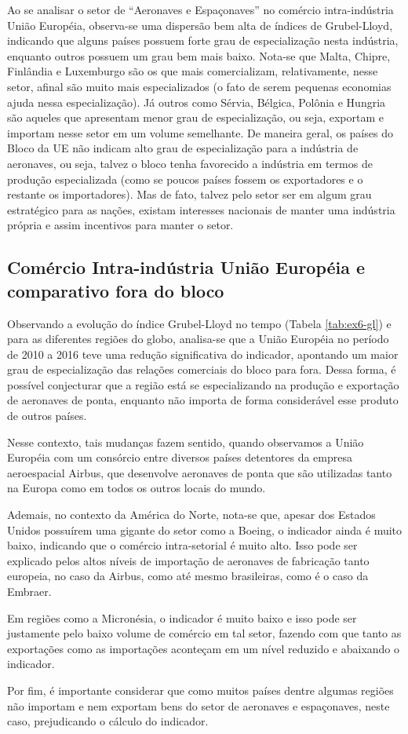 Ao se analisar o setor de “Aeronaves e Espaçonaves” no comércio intra-indústria União Européia, observa-se uma dispersão bem alta de índices de Grubel-Lloyd, indicando que alguns países possuem forte grau de especialização nesta indústria, enquanto outros possuem um grau bem mais baixo. Nota-se que Malta, Chipre, Finlândia e Luxemburgo são os que mais comercializam, relativamente, nesse setor, afinal são muito mais especializados (o fato de serem pequenas economias ajuda nessa especialização). Já outros como Sérvia, Bélgica, Polônia e Hungria são aqueles que apresentam menor grau de especialização, ou seja, exportam e importam nesse setor em um volume semelhante. De maneira geral, os países do Bloco da UE não indicam alto grau de especialização para a indústria de aeronaves, ou seja, talvez o bloco tenha favorecido a indústria em termos de produção especializada (como se poucos países fossem os exportadores e o restante os importadores). Mas de fato, talvez pelo setor ser em algum grau estratégico para as nações, existam interesses nacionais de manter uma indústria própria e assim incentivos para manter o setor.

\subsection{Comércio Intra-indústria União Européia e comparativo fora do bloco}



Observando a evolução do índice Grubel-Lloyd no tempo (Tabela \ref{tab:ex6-gl}) e para as diferentes regiões do globo, analisa-se que a União Européia no período de 2010 a 2016 teve uma redução significativa do indicador, apontando um maior grau de especialização das relações comerciais do bloco para fora. Dessa forma, é possível conjecturar que a região está se especializando na produção e exportação de aeronaves de ponta, enquanto não importa de forma considerável esse produto de outros países. 

Nesse contexto, tais mudanças fazem sentido, quando observamos a União Européia com um consórcio entre diversos países detentores da empresa aeroespacial Airbus, que desenvolve aeronaves de ponta que são utilizadas tanto na Europa como em todos os outros locais do mundo.

Ademais, no contexto da América do Norte, nota-se que, apesar dos Estados Unidos possuírem uma gigante do setor como a Boeing, o indicador ainda é muito baixo, indicando que o comércio intra-setorial é muito alto. Isso pode ser explicado pelos altos níveis de importação de aeronaves de fabricação tanto europeia, no caso da Airbus, como até mesmo brasileiras, como é o caso da Embraer.

Em regiões como a Micronésia, o indicador é muito baixo e isso pode ser justamente pelo baixo volume de comércio em tal setor, fazendo com que tanto as exportações como as importações aconteçam em um nível reduzido e abaixando o indicador.  

Por fim, é importante considerar que como muitos países dentre algumas regiões não importam e nem exportam bens do setor de aeronaves e espaçonaves, neste caso, prejudicando o cálculo do indicador. 


\clearpage
